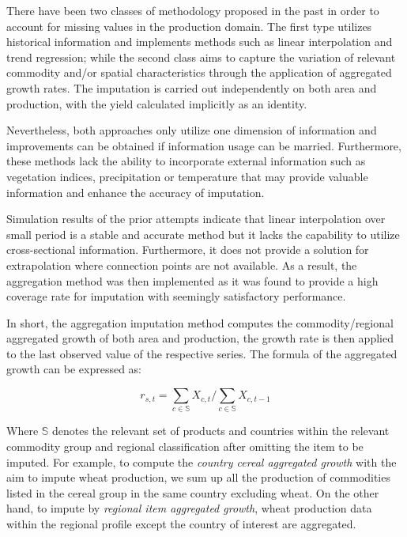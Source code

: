 \documentclass[nojss]{jss}\usepackage[]{graphicx}\usepackage[]{color}
\begin{document}
There have been two classes of methodology proposed in the past in
order to account for missing values in the production domain. The
first type utilizes historical information and implements methods such
as linear interpolation and trend regression; while the second class
aims to capture the variation of relevant commodity
and/or spatial characteristics through the application of
aggregated growth rates. The imputation is carried out independently
on both area and production, with the yield calculated implicitly as
an identity.

Nevertheless, both approaches only utilize one dimension of
information and improvements can be obtained if information usage
can be married. Furthermore, these methods lack the ability to
incorporate external information such as vegetation indices,
precipitation or temperature that may provide valuable information and
enhance the accuracy of imputation.

Simulation results of the prior attempts indicate that linear
interpolation over small period is a stable and accurate method but it
lacks the capability to utilize cross-sectional
information. Furthermore, it does not provide a solution for
extrapolation where connection points are not available. As a result,
the aggregation method was then implemented as it was found to provide
a high coverage rate for imputation with seemingly satisfactory
performance.

In short, the aggregation imputation method computes the
commodity/regional aggregated growth of both area and production, the
growth rate is then applied to the last observed value of the
respective series. The formula of the aggregated growth can be
expressed as:

\begin{equation}
  \label{eq:aggregateGrowth}
  r_{s, t} = \sum_{c \in \mathbb{S}} X_{c, t}/\sum_{c \in \mathbb{S}} X_{c, t-1}
\end{equation}

Where $\mathbb{S}$ denotes the relevant set of products and countries
within the relevant commodity group and regional classification after
omitting the item to be imputed. For example, to compute the
\textit{country cereal aggregated growth} with the aim to impute wheat
production, we sum up all the production of commodities listed in the
cereal group in the same country excluding wheat. On the other hand,
to impute by \textit{regional item aggregated growth}, wheat
production data within the regional profile except the country of
interest are aggregated.\\
\end{document}
